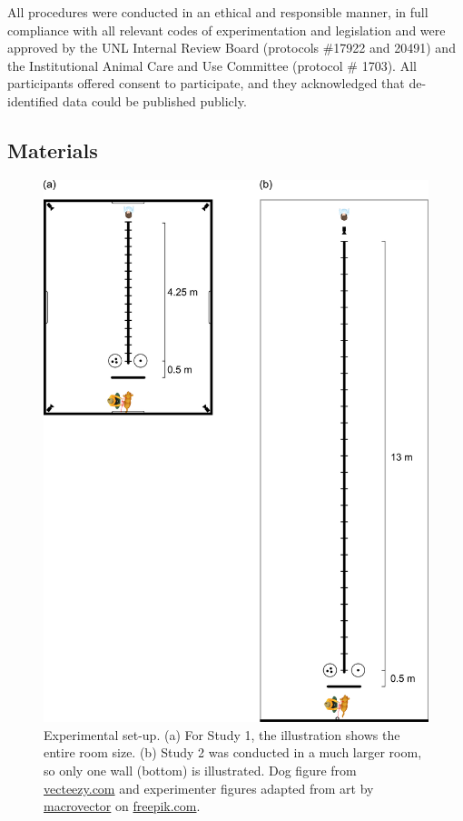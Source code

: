 \documentclass[
  pub,floatsintext]{apa6}
\begin{document}
All procedures were conducted in an ethical and responsible manner, in full compliance with all relevant codes of experimentation and legislation and were approved by the UNL Internal Review Board (protocols \#17922 and 20491) and the Institutional Animal Care and Use Committee (protocol \# 1703). All participants offered consent to participate, and they acknowledged that de-identified data could be published publicly.

\hypertarget{materials}{%
\subsection{Materials}\label{materials}}

\begin{figure}

{\centering \includegraphics[width=0.8\linewidth]{figures/setup_study} 

}

\caption{Experimental set-up. (a) For Study 1, the illustration shows the entire room size.  (b) Study 2 was conducted in a much larger room, so only one wall (bottom) is illustrated. Dog figure from \href{https://vecteezy.com}{vecteezy.com} and experimenter figures adapted from art by \href{https://www.freepik.com/macrovector}{macrovector} on \href{https://www.freepik.com/free-vector/professions-top-view-colored-icons-set_3997920.htm}{freepik.com}.}\label{fig:exp-setup}
\end{figure}
\end{document}

